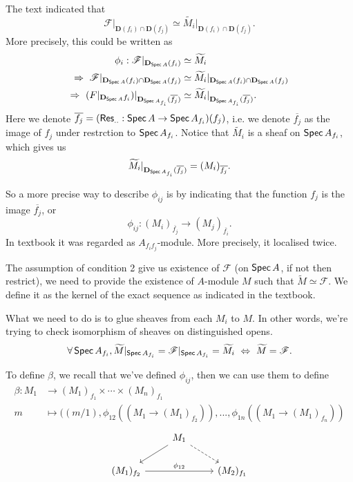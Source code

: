 The text indicated that 
\[\mathscr F\vert_{\mathbf D(f_i)\cap \mathbf D(f_j)}\simeq \widetilde{M_i}\vert_{\mathbf D(f_i)\cap \mathbf D(f_j)}.\]
More precisely, this could be written as 
\begin{align*}
    \phi_i: \mathscr F\vert_{\mathbf D_{\operatorname{\mathsf{Spec}} A}(f_i)} &\simeq \widetilde{M_i}\\
    \Rightarrow~ \mathscr F\vert_{\mathbf D_{\operatorname{\mathsf{Spec}} A}(f_i)\cap \mathbf D_{\operatorname{\mathsf{Spec}} A}(f_j)} &\simeq \widetilde{M_i}\vert_{\mathbf D_{\operatorname{\mathsf{Spec}} A}(f_i)\cap \mathbf D_{\operatorname{\mathsf{Spec}} A}(f_j)}\\
    \Rightarrow~ \mathscr (F\vert_{\mathbf D_{\operatorname{\mathsf{Spec}} A}{f_i}})\vert_{\mathbf D_{\operatorname{\mathsf{Spec}} A_{f_i}}(\overline{f_j})} &\simeq \widetilde{M_i}\vert_{\mathbf D_{\operatorname{\mathsf{Spec}} A_{f_i}}(\overline{f_j})}.
\end{align*}Here we denote $\overline{f_j}=(\operatorname{\mathsf{Res}}_{..}:\operatorname{\mathsf{Spec}} A\to \operatorname{\mathsf{Spec}} A_{f_i})(f_j)$, i.e. we denote $\overline{f_j}$ as the image of $f_j$ under restrction to $\operatorname{\mathsf{Spec}} A_{f_i}$.
Notice that $\widetilde{M_i}$ is a sheaf on $\operatorname{\mathsf{Spec}} A_{f_i}$, which gives us 
\[\widetilde{M_i}\vert_{\mathbf D_{\operatorname{\mathsf{Spec}} A_{f_i}}(\overline{f_j})}=(M_i)_{\overline{f_j}}.\]

So a more precise way to describe $\phi_{ij}$ is by indicating that the function $f_j$ is the image $\overline{f_j}$, or 
\[\phi_{ij}:(M_i)_{\overline{f_j}}\to (M_j)_{\overline{f_i}}.\]
In textbook it was regarded as $A_{f_if_j}$-module. More precisely, it localised twice. 

The assumption of condition 2 give us existence of $\mathscr F$ (on $\operatorname{\mathsf{Spec}} A$, if not then restrict), we need to provide the existence of $A$-module $M$ such that $\widetilde M\simeq \mathscr F$. We define it as the kernel of the exact sequence as indicated in the textbook. 

What we need to do is to glue sheaves from each $M_i$ to $M$. In other words, we're trying to check isomorphism of sheaves on distinguished opens.
\[\forall \operatorname{\mathsf{Spec}} A_{f_i}, \widetilde M\vert_{\operatorname{\mathsf{Spec}} A_{f_i}}=\mathscr F\vert_{\operatorname{\mathsf{Spec}} A_{f_i}}=\widetilde{M_i} ~\Leftrightarrow~ \widetilde M=\mathscr F.\]


To define $\beta$, we recall that we've defined $\phi_{ij}$, then we can use them to define 
\begin{align*}
    \beta: M_1 &\to (M_1)_{f_1}\times\cdots\times (M_n)_{f_1}\\
    m &\mapsto ((m/1),\phi_{12}((M_1\to (M_1)_{f_2})),...,\phi_{1n}((M_1\to (M_1)_{f_n}))
\end{align*}
\[\begin{tikzcd}
	& {M_1} \\
	{(M_1)_{f_2}} && {(M_2)_{f_1}}
	\arrow[from=1-2, to=2-1]
	\arrow[dashed, from=1-2, to=2-3]
	\arrow["{\phi_{12}}", from=2-1, to=2-3]
\end{tikzcd}\]

